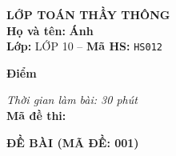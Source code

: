 \noindent
\begin{tcolorbox}[colback=white,colframe=black,arc=0mm,boxrule=0.8pt,top=4pt,bottom=4pt,left=6pt,right=6pt]
	\begin{minipage}[c]{0.44\textwidth}
		{\bfseries\large LỚP TOÁN THẦY THÔNG}\\[3pt]
		\textbf{Họ và tên:} \textbf{\large Ánh}\\[3pt]
		\textbf{Lớp:} LỚP 10 \quad -- \quad \textbf{Mã HS:} \texttt{HS012}
	\end{minipage}
	\hfill
	\begin{minipage}[c]{0.22\textwidth}
		\begin{tcolorbox}[colback=white,colframe=black,arc=0mm,boxrule=0.6pt,height=1.8cm,halign=center,valign=top,top=2pt]
			{\bfseries\normalsize Điểm}
		\end{tcolorbox}
	\end{minipage}
	\hfill
	\begin{minipage}[c]{0.30\textwidth}
		\raggedleft
		\textit{Thời gian làm bài: 30 phút}\\[4pt]
		\textbf{Mã đề thi:} 
	\end{minipage}
\end{tcolorbox}
\vspace{0.25cm}

\noindent\textbf{\large ĐỀ BÀI (MÃ ĐỀ: 001)}
\vspace{0.1cm}

